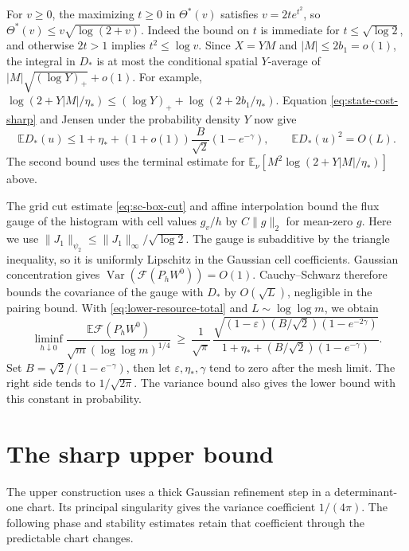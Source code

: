 \documentclass[11pt]{article}
\newcommand{\1}{\mathbf{1}}
\numberwithin{equation}{section}
\newcommand{\E}{\mathbb E}
\newcommand{\Var}{\operatorname{Var}}
\begin{document}
For \(v\ge0\), the maximizing \(t\ge0\) in \(\Theta^*(v)\)
satisfies \(v=2te^{t^2}\), so
\(\Theta^*(v)\le v\sqrt{\log(2+v)}\). Indeed the bound on
\(t\) is immediate for \(t\le\sqrt{\log 2}\), and otherwise
\(2t>1\) implies \(t^2\le\log v\). Since \(X=YM\) and
\(|M|\le2b_1=o(1)\), the integral in \(D_*\) is at most
the conditional spatial \(Y\)-average of
\(|M|\sqrt{(\log Y)_+}+o(1)\). For example,
\(\log(2+Y|M|/\eta_*)\le(\log Y)_++\log(2+2b_1/\eta_*)\).
Equation \eqref{eq:state-cost-sharp} and Jensen under
the probability density \(Y\) now give
\[
 \E D_*(u)\le 1+\eta_*+(1+o(1))\frac B{\sqrt2}(1-e^{-\gamma}),
 \qquad \E D_*(u)^2=O(L).
\]
The second bound uses the terminal estimate for
\(\E_\nu[M^2\log(2+Y|M|/\eta_*)]\) above.

The grid cut estimate \eqref{eq:sc-box-cut} and affine
interpolation bound the flux gauge of the histogram with cell
values \(g_v/h\) by \(C\|g\|_2\) for mean-zero \(g\).
Here we use \(\|J_1\|_{\psi_2}\le \|J_1\|_\infty/\sqrt{\log 2}\).
The gauge is subadditive by the triangle inequality, so it is
uniformly Lipschitz in the Gaussian cell coefficients.
Gaussian concentration gives \(\Var(\mathcal F(P_hW^0))=O(1)\). Cauchy--Schwarz
therefore bounds the covariance of the gauge with \(D_*\)
by \(O(\sqrt L)\), negligible in the pairing bound.
With \eqref{eq:lower-resource-total} and \(L\sim\log\log m\), we obtain
\[
 \liminf_{h\downarrow0}
 \frac{\E\mathcal F(P_hW^0)}{\sqrt m(\log\log m)^{1/4}}
 \ \ge\
 \frac1{\sqrt\pi}\,
 \frac{\sqrt{(1-\varepsilon)(B/\sqrt2)(1-e^{-2\gamma})}}
      {1+\eta_*+(B/\sqrt2)(1-e^{-\gamma})}.
\]
Set \(B=\sqrt2/(1-e^{-\gamma})\), then let
\(\varepsilon,\eta_*,\gamma\) tend to zero after the
mesh limit. The right side tends to \(1/\sqrt{2\pi}\).
The variance bound also gives the lower bound with this
constant in probability.

\section{The sharp upper bound}
\label{sec:sharp-upper}

The upper construction uses a thick Gaussian refinement step in
a determinant-one chart. Its principal singularity gives the
variance coefficient \(1/(4\pi)\). The following phase and
stability estimates retain that coefficient through the
predictable chart changes.
\end{document}
